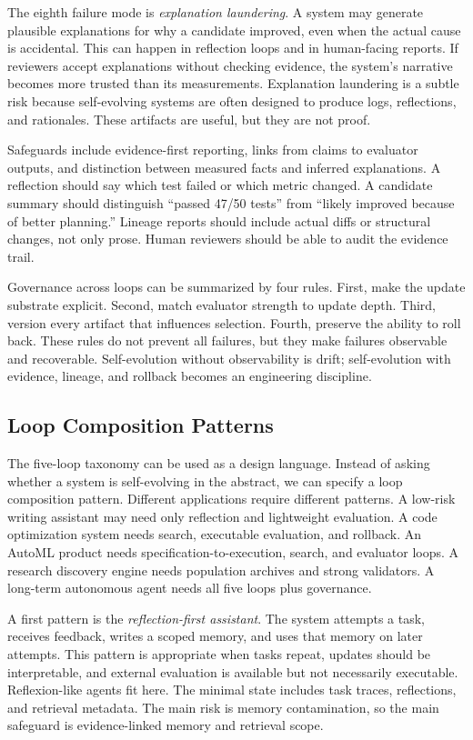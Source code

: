 The eighth failure mode is \emph{explanation laundering}.  A system may generate plausible explanations for why a candidate improved, even when the actual cause is accidental.  This can happen in reflection loops and in human-facing reports.  If reviewers accept explanations without checking evidence, the system's narrative becomes more trusted than its measurements.  Explanation laundering is a subtle risk because self-evolving systems are often designed to produce logs, reflections, and rationales.  These artifacts are useful, but they are not proof.

Safeguards include evidence-first reporting, links from claims to evaluator outputs, and distinction between measured facts and inferred explanations.  A reflection should say which test failed or which metric changed.  A candidate summary should distinguish ``passed 47/50 tests'' from ``likely improved because of better planning.''  Lineage reports should include actual diffs or structural changes, not only prose.  Human reviewers should be able to audit the evidence trail.

Governance across loops can be summarized by four rules.  First, make the update substrate explicit.  Second, match evaluator strength to update depth.  Third, version every artifact that influences selection.  Fourth, preserve the ability to roll back.  These rules do not prevent all failures, but they make failures observable and recoverable.  Self-evolution without observability is drift; self-evolution with evidence, lineage, and rollback becomes an engineering discipline.

\subsection{Loop Composition Patterns}
\label{subsec:taxonomy-composition-patterns}

The five-loop taxonomy can be used as a design language.  Instead of asking whether a system is self-evolving in the abstract, we can specify a loop composition pattern.  Different applications require different patterns.  A low-risk writing assistant may need only reflection and lightweight evaluation.  A code optimization system needs search, executable evaluation, and rollback.  An AutoML product needs specification-to-execution, search, and evaluator loops.  A research discovery engine needs population archives and strong validators.  A long-term autonomous agent needs all five loops plus governance.

A first pattern is the \emph{reflection-first assistant}.  The system attempts a task, receives feedback, writes a scoped memory, and uses that memory on later attempts.  This pattern is appropriate when tasks repeat, updates should be interpretable, and external evaluation is available but not necessarily executable.  Reflexion-like agents fit here.  The minimal state includes task traces, reflections, and retrieval metadata.  The main risk is memory contamination, so the main safeguard is evidence-linked memory and retrieval scope.

